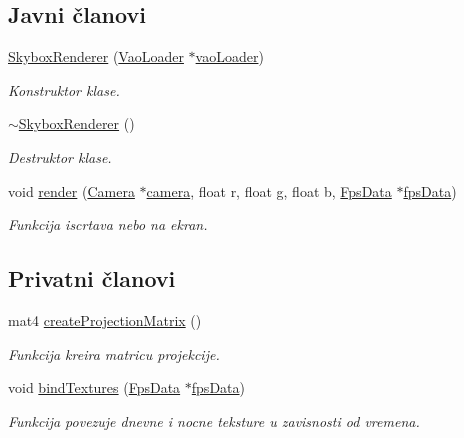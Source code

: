\subsection*{Javni članovi}
\begin{DoxyCompactItemize}
\item 
\hyperlink{classcore_1_1SkyboxRenderer_a2b7e44e90391374f8583c2143a6b1e25}{Skybox\+Renderer} (\hyperlink{classcore_1_1VaoLoader}{Vao\+Loader} $\ast$\hyperlink{namespacecore_a78dd24784c415d3759a0f71b8f4f9f81}{vao\+Loader})
\begin{DoxyCompactList}\small\item\em Konstruktor klase. \end{DoxyCompactList}\item 
\hyperlink{classcore_1_1SkyboxRenderer_aa2c93db248d8df20a05823139e8751a7}{$\sim$\+Skybox\+Renderer} ()
\begin{DoxyCompactList}\small\item\em Destruktor klase. \end{DoxyCompactList}\item 
void \hyperlink{classcore_1_1SkyboxRenderer_a6ab6906aa0c5ff7931088a0ddd52e4c6}{render} (\hyperlink{classentity_1_1Camera}{Camera} $\ast$\hyperlink{namespacecore_a9d645c490b142886301256f6cf9c65c2}{camera}, float r, float g, float b, \hyperlink{classutility_1_1FpsData}{Fps\+Data} $\ast$\hyperlink{namespacecore_a5d5106eb67b679c9260ebe0a9faf14db}{fps\+Data})
\begin{DoxyCompactList}\small\item\em Funkcija iscrtava nebo na ekran. \end{DoxyCompactList}\end{DoxyCompactItemize}
\subsection*{Privatni članovi}
\begin{DoxyCompactItemize}
\item 
mat4 \hyperlink{classcore_1_1SkyboxRenderer_a27b7410b8520160da370a2707ac29b7e}{create\+Projection\+Matrix} ()
\begin{DoxyCompactList}\small\item\em Funkcija kreira matricu projekcije. \end{DoxyCompactList}\item 
void \hyperlink{classcore_1_1SkyboxRenderer_a555969e8b9ba0bf2a2dea2756974c3b6}{bind\+Textures} (\hyperlink{classutility_1_1FpsData}{Fps\+Data} $\ast$\hyperlink{namespacecore_a5d5106eb67b679c9260ebe0a9faf14db}{fps\+Data})
\begin{DoxyCompactList}\small\item\em Funkcija povezuje dnevne i nocne teksture u zavisnosti od vremena. \end{DoxyCompactList}\end{DoxyCompactItemize}
